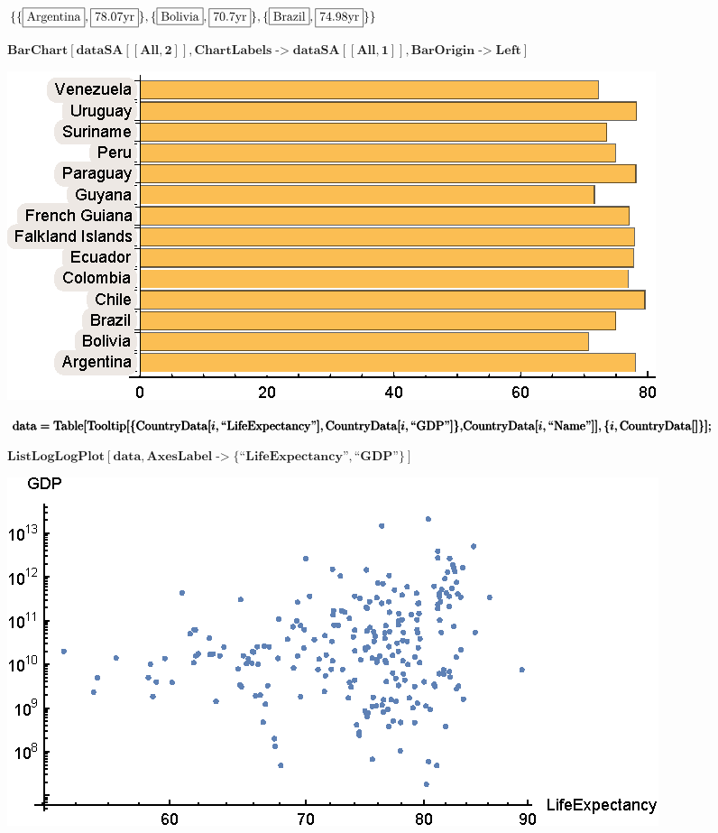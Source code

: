 \documentclass{article}
\begin{document}
\begin{doublespace}
\noindent\(\{\{\fbox{$\text{Argentina}$},\fbox{$78.07\text{yr}$}\},\{\fbox{$\text{Bolivia}$},\fbox{$70.7\text{yr}$}\},\{\fbox{$\text{Brazil}$},\fbox{$74.98\text{yr}$}\}\}\)
\end{doublespace}

\begin{doublespace}
\noindent\(\pmb{\text{BarChart}[\text{dataSA}[[\text{All},2]],\text{ChartLabels}\text{-$>$}\text{dataSA}[[\text{All},1]],\text{BarOrigin}\text{-$>$}\text{Left}]}\)
\end{doublespace}

\includegraphics{WLG_gr3.eps}

\begin{doublespace}
\noindent\(\pmb{\text{data}=\text{Table}[\text{Tooltip}[\{\text{CountryData}[i,\text{{``}LifeExpectancy{''}}],\text{CountryData}[i,\text{{``}GDP{''}}]\},}\\
\pmb{\text{CountryData}[i,\text{{``}Name{''}}]],\{i,\text{CountryData}[]\}];}\)
\end{doublespace}

\begin{doublespace}
\noindent\(\pmb{\text{ListLogLogPlot}[\text{data},\text{AxesLabel}\text{-$>$}\{\text{{``}LifeExpectancy{''}},\text{{``}GDP{''}}\}]}\)
\end{doublespace}

\includegraphics{WLG_gr4.eps}
\end{document}
